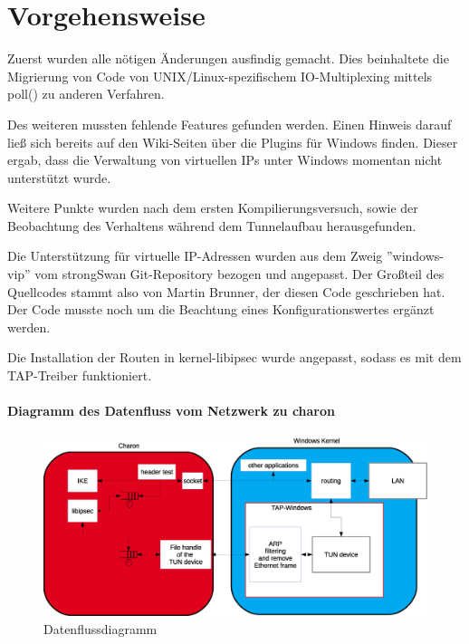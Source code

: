 



\section{Vorgehensweise}

Zuerst wurden alle nötigen Änderungen ausfindig gemacht. Dies beinhaltete
die Migrierung von Code von UNIX/Linux-spezifischem IO-Multiplexing
mittels poll() zu anderen Verfahren.

Des weiteren mussten fehlende Features gefunden werden. Einen Hinweis
darauf ließ sich bereits auf den Wiki-Seiten über die Plugins für Windows finden.
Dieser ergab, dass die Verwaltung von virtuellen IPs unter Windows momentan
nicht unterstützt wurde.

Weitere Punkte wurden nach dem ersten Kompilierungsversuch, sowie der Beobachtung
des Verhaltens während dem Tunnelaufbau herausgefunden.

Die Unterstützung für virtuelle IP-Adressen wurden aus dem Zweig ''windows-vip''
vom strongSwan Git-Repository bezogen und angepasst. Der Großteil des Quellcodes
stammt also von Martin Brunner, der diesen Code geschrieben hat. Der Code musste
noch um die Beachtung eines Konfigurationswertes ergänzt werden.

Die Installation der Routen in kernel-libipsec wurde angepasst, sodass es
mit dem TAP-Treiber funktioniert.

\paragraph{Diagramm des Datenfluss vom Netzwerk zu charon}
\begin{figure}
\includegraphics{Diagram.eps}
\caption{Datenflussdiagramm}
\label{fig:Datenflussdiagramm}
\end{figure}

